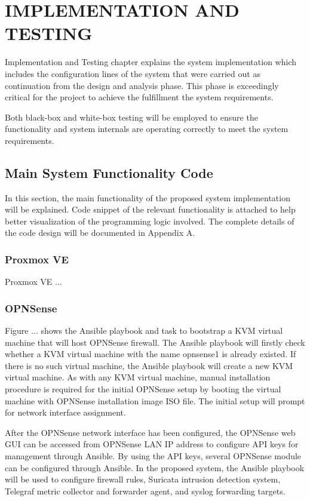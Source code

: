 \documentclass[../index.tex]{subfiles}
\begin{document}
\chapter{IMPLEMENTATION AND TESTING}

Implementation and Testing chapter explains the system implementation which includes the
configuration lines of the system that were carried out as continuation from the design and analysis
phase. This phase is exceedingly critical for the project to achieve the fulfillment the system
requirements.

Both black-box and white-box testing will be employed to ensure the functionality and system
internals are operating correctly to meet the system requirements.

\section{Main System Functionality Code}

In this section, the main functionality of the proposed system implementation will be explained.
Code snippet of the relevant functionality is attached to help better visualization of the
programming logic involved. The complete details of the code design will be documented in Appendix
A.

\subsection{Proxmox VE}

Proxmox VE ...

\subsection{OPNSense}

Figure ... shows the Ansible playbook and task to bootstrap a KVM virtual machine that will host
OPNSense firewall. The Ansible playbook will firstly check whether a KVM virtual machine with the
name opnsense1 is already existed. If there is no such virtual machine, the Ansible playbook will
create a new KVM virtual machine. As with any KVM virtual machine, manual installation procedure is
required for the initial OPNSense setup by booting the virtual machine with OPNSense installation
image ISO file. The initial setup will prompt for network interface assignment.

After the OPNSense network interface has been configured, the OPNSense web GUI can be accessed from
OPNSense LAN IP address to configure API keys for management through Ansible. By using the API keys,
several OPNSense module can be configured through Ansible. In the proposed system, the Ansible
playbook will be used to configure firewall rules, Suricata intrusion detection system, Telegraf
metric collector and forwarder agent, and syslog forwarding targets. 
\end{document}
